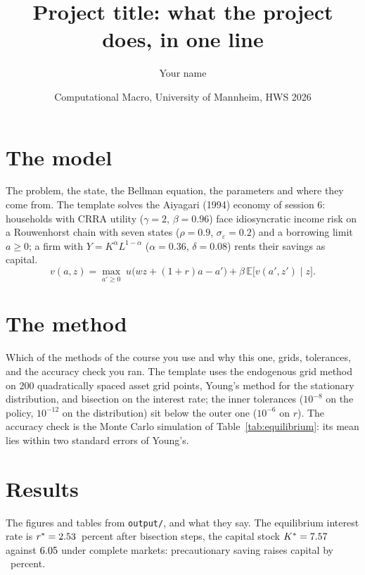 \documentclass[11pt,a4paper]{article}
\title{Project title: what the project does, in one line}
\author{Your name}
\date{Computational Macro, University of Mannheim, HWS 2026}
\begin{document}
\maketitle

\section{The model}

The problem, the state, the Bellman equation, the parameters and where they come from. The template solves the
Aiyagari (1994) economy of session 6: households with CRRA utility ($\gamma = 2$, $\beta = 0.96$) face
idiosyncratic income risk on a Rouwenhorst chain with seven states ($\rho = 0.9$, $\sigma_\varepsilon = 0.2$) and
a borrowing limit $a \geq 0$; a firm with $Y = K^\alpha L^{1 - \alpha}$ ($\alpha = 0.36$, $\delta = 0.08$) rents
their savings as capital.
\begin{equation}
    v(a, z) = \max_{a' \geq 0} \; u\bigl(w z + (1 + r) a - a'\bigr) + \beta \, \mathbb{E}\bigl[v(a', z') \mid z\bigr].
\end{equation}

\section{The method}

Which of the methods of the course you use and why this one, grids, tolerances, and the accuracy check you ran.
The template uses the endogenous grid method on $200$ quadratically spaced asset grid points, Young's method
for the stationary distribution, and bisection on the interest rate; the inner tolerances ($10^{-8}$ on the
policy, $10^{-12}$ on the distribution) sit below the outer one ($10^{-6}$ on $r$). The accuracy check is the
Monte Carlo simulation of Table~\ref{tab:equilibrium}: its mean lies within two standard errors of Young's.

\section{Results}

The figures and tables from \texttt{output/}, and what they say. The equilibrium interest rate is
$r^* = 2.53$~percent after \bisectionsteps{} bisection steps, the capital stock $K^* = 7.57$ against
$6.05$ under complete markets: precautionary saving raises capital by \Kgain~percent.

\begin{table}[h]
    \centering
    \caption{The stationary equilibrium of the baseline economy}
    \label{tab:equilibrium}
    
\end{table}
\end{document}
